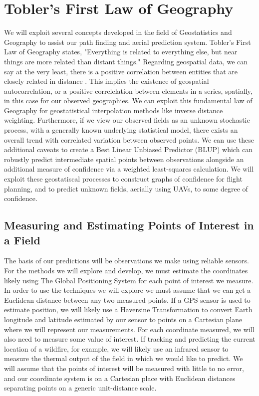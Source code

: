 \documentclass[11pt]{ucthesis}
\begin{document}
\section{Tobler's First Law of Geography}
We will exploit several concepts developed in the field of Geostatistics and Geography to assist our path finding and aerial prediction system. Tobler's First Law of Geography \cite{tobler:first_law} states, "Everything is related to everything else, but near things are more related than distant things." Regarding geospatial data, we can say at the very least, there is a positive correlation between entities that are closely related in distance \cite{miller:on_toblers_first_law}. This implies the existence of geospatial autocorrelation, or a positive correlelation between elements in a series, spatially, in this case for our observed geographies. We can exploit this fundamental law of Geography for geostatistical interpolation methods like inverse distance weighting. Furthermore, if we view our observed fields as an unknown stochastic process, with a generally known underlying statistical model, there exists an overall trend with correlated variation between observed points. We can use these additional caveats to create a Best Linear Unbiased Predictor (BLUP) which can robustly predict intermediate spatial points between observations alongside an additional measure of confidence via a weighted least-squares calculation. We will exploit these geostatiscal processes to construct graphs of confidence for flight planning, and to predict unknown fields, aerially using UAVs, to some degree of confidence.

\subsection{Measuring and Estimating Points of Interest in a Field}
The basis of our predictions will be observations we make using reliable sensors. For the methods we will explore and develop, we must estimate the coordinates likely using The Global Positioning System for each point of interest we measure. In order to use the techniques we will explore we must assume that we can get a Euclidean distance between any two measured points. If a GPS sensor is used to estimate position, we will likely use a Haversine Transformation to convert Earth longitude and latitude estimated by our sensor to points on a Cartesian plane where we will represent our measurements. For each coordinate measured, we will also need to measure some value of interest. If tracking and predicting the current location of a wildfire, for example, we will likely use an infrared sensor to measure the thermal output of the field in which we would like to predict. We will assume that the points of interest will be measured with little to no error, and our coordinate system is on a Cartesian place with Euclidean distances separating points on a generic unit-distance scale.
\end{document}
